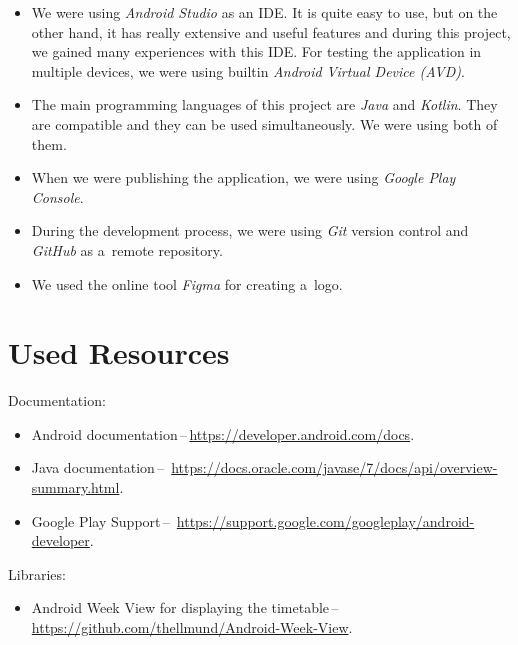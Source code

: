 \documentclass[12pt, a4paper, titlepage, final]{article}
\begin{document}
\begin{itemize}
	\item
		We were using \emph{Android Studio} as an IDE. It is quite easy to use,
		but on the other hand, it has really extensive and useful features and
		during this project, we gained many experiences with this IDE. For
		testing the application in multiple devices, we were using builtin
		\emph{Android Virtual Device (AVD)}.

	\item
		The main programming languages of this project are \emph{Java} and
		\emph{Kotlin}. They are compatible and they can be used simultaneously.
		We were using both of them.

	\item
		When we were publishing the application, we were using \emph{Google
		Play Console}.

	\item
		During the development process, we were using \emph{Git} version control
		and \emph{GitHub} as a~remote repository.

	\item
		We used the online tool \emph{Figma} for creating a~logo.
\end{itemize}


\section*{Used Resources}

Documentation:
\begin{itemize}
	\item
		Android documentation\,--\,\url{https://developer.android.com/docs}.
	\item
		Java documentation\,--\,%
		\url{https://docs.oracle.com/javase/7/docs/api/overview-summary.html}.
	\item
		Google Play Support\,--\,%
		\url{https://support.google.com/googleplay/android-developer}.
\end{itemize}
Libraries:
\begin{itemize}
	\item
		Android Week View for displaying the timetable\,--\,%
		\url{https://github.com/thellmund/Android-Week-View}.
\end{itemize}

\end{document}
